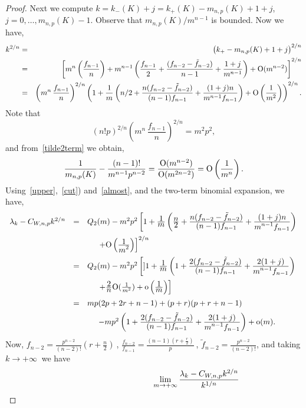 \documentclass[11pt,a4paper,times]{amsart}
\theoremstyle{plain}
\theoremstyle{definition}
\numberwithin{equation}{section}
\newcommand{\bo}{{\rm O}}
\newcommand{\ds}{\displaystyle}
\newcommand{\eqskip}{ \vspace*{2mm}\\ }
\newcommand{\so}{{\rm o}}
\newcommand{\fr}[2]{\frac{\ds #1}{\ds #2}}
\begin{document}
{\begin{proof}
 Next we compute $k= k_-(K)+ j= k_+(K)-m_{n,p}(K)+1+j$, $j=0, \ldots, m_{n,p}(K)-1$.
 Observe that $m_{n,p}(K)/m^{n-1}$ is bounded. Now we have,
\begin{eqnarray}\nonumber
k^{2/n}&=&\big{(}k_+-m_{n,p}(K)+1+j \big{)}^{2/n}\eqskip
&=&\left[ m^n\left(\frac{f_{n-1}}{n}\right)+ m^{n-1}\left(\frac{f_{n-1}}{2}
+\frac{(f_{n-2}-\tilde{f}_{n-2})}{n-1} +\frac{1+j}{m^{n-1}}\right)+ \bo(m^{n-2})\right]^{2/n}\nonumber
 \eqskip \label{upper}
 &=& \left(m^n\,\frac{f_{n-1}}{n}\right)^{2/n}\left( 1 +\frac{1}{m}\left( n/2
+\frac{n(f_{n-2}-\tilde{f}_{n-2})}{(n-1)f_{n-1}} +\frac{(1+j)n}{m^{n-1}f_{n-1}}\right)+\bo\left(\frac{1}{m^2}\right)\right)^{2/n}.
 \end{eqnarray}
  Note that
 \begin{equation}\label{cut}
 (n!p)^{2/n}\left(m^n\,\frac{f_{n-1}}{n}\right)^{2/n}=m^2p^2,
 \end{equation}
 and from~\eqref{tilde2term} we obtain, %
 \begin{equation}\label{almost}
 \frac{1}{m_{n,p}(K)}-\frac{(n-1)!}{m^{n-1}p^{n-2}}=\frac{\bo(m^{n-2})}{\bo(m^{2n-2})}=\bo\left(\frac{1}{m^{n}}\right).
 \end{equation}
Using~\eqref{upper},~\eqref{cut}) and~\eqref{almost}, and the two-term binomial expansion, we have,
\[
\begin{array}{lll}
\lambda_k-C_{W,n,p}k^{2/n} & = & Q_2(m) - m^2p^2\left[ 1 +\fr{1}{m}\left(\fr{n}{2}
+\fr{n(f_{n-2}-\tilde{f}_{n-2})}{(n-1)f_{n-1}} +\fr{(1+j)n}{m^{n-1}f_{n-1}}\right)\right.\eqskip
& &\hspace*{5mm}\left.+\bo\left(\fr{1}{m^2}\right)\right]^{2/n}\eqskip
&=& Q_2(m) - m^2p^2\left[] 1 +\fr{1}{m}\left(1+\fr{2(f_{n-2}-\tilde{f}_{n-2})}{(n-1)f_{n-1}} +\fr{2(1+j)}{m^{n-1}f_{n-1}}\right)\right.
\eqskip
& &\hspace*{5mm} \left.+\fr{2}{n}\bo(\frac{1}{m^2})+\so
\left(\fr{1}{m}\right)
\right]\eqskip
&=& mp(2p+2r+n-1)+(p+r)(p+r+n-1)\eqskip
& &\hspace*{5mm}-{mp^2}\left(1 +\fr{2(f_{n-2}-\tilde{f}_{n-2})}{(n-1)f_{n-1}} + \fr{2(1+j)}{m^{n-1}f_{n-1}}\right)+\so(m).
\end{array}
\]
Now,
 $f_{n-2}=\frac{p^{n-2}}{(n-2)!}\left(r+\frac{n}{2}\right)~$, $\frac{f_{n-2}}{f_{n-1}}=\frac{(n-1)(r+\frac{r}{2})}{p}~$, $\tilde{f}_{n-2}=\frac{p^{n-2}}{(n-2)!}$,
 and taking $k\to +\infty~$ we have
\begin{gather*}
\begin{array}{lll}
\lefteqn{\lim_{m\to +\infty}\frac{\lambda_k-C_{W,n,p}k^{2/n}}{k^{1/n}
}}
\end{array}
\end{gather*}
\end{proof}}
\end{document}
